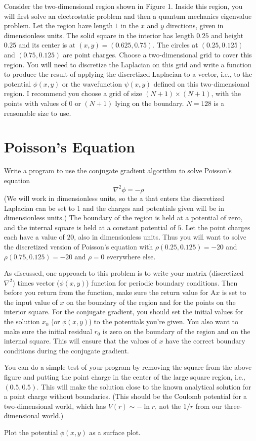 Consider the two-dimensional region shown in Figure 1. Inside this region, you will first
solve an electrostatic problem and then a quantum mechanics eigenvalue problem. Let the
region have length \(1\) in the \(x\) and \(y\) directions, given in dimensionless units.
The solid square in the interior has length \(0.25\) and height \(0.25\) and its center is
at \((x, y) = (0.625, 0.75)\). The circles at \((0.25, 0.125)\) and \((0.75, 0.125)\) are
point charges. Choose a two-dimensional grid to cover this region. You will need to
discretize the Laplacian on this grid and write a function to produce the result of applying
the discretized Laplacian to a vector, i.e., to the potential \(\phi(x, y)\) or the
wavefunction \(\psi(x, y)\) defined on this two-dimensional region. I recommend you choose a
grid of size \((N + 1) \times (N + 1)\), with the points with values of \(0\) or \((N + 1)\)
lying on the boundary. \(N = 128\) is a reasonable size to use.

\section{Poisson's Equation}

Write a program to use the conjugate gradient algorithm to solve Poisson's equation
%
\begin{equation}
    \nabla^2 \phi = -\rho
\end{equation}
%
(We will work in dimensionless units, so the a that enters the discretized Laplacian can be
set to \(1\) and the charges and potentials given will be in dimensionless units.) The
boundary of the region is held at a potential of zero, and the internal square is held at a
constant potential of \(5\). Let the point charges each have a value of \(20\), also in
dimensionless units. Thus you will want to solve the discretized version of Poisson's
equation with \(\rho(0.25, 0.125) = -20\) and \(\rho(0.75, 0.125) = -20\) and \(\rho = 0\)
everywhere else.

As discussed, one approach to this problem is to write your matrix
(discretized \(\nabla^2\)) times vector (\(\phi(x, y)\)) function for periodic boundary
conditions. Then before you return from the function, make sure the return value for
\(\mathrm{ A } x\) is set to the input value of \(x\) on the boundary of the region and for
the points on the interior square. For the conjugate gradient, you should set the initial
values for the solution \(x_0\) (or \(\phi(x, y)\)) to the potentials you're given. You also
want to make sure the initial residual \(r_0\) is zero on the boundary of the region and on
the internal square. This will ensure that the values of \(x\) have the correct boundary
conditions during the conjugate gradient.

You can do a simple test of your program by
removing the square from the above figure and putting the point charge in the center of the
large square region, i.e., \((0.5, 0.5)\). This will make the solution close to the known
analytical solution for a point charge without boundaries. (This should be the Coulomb
potential for a two-dimensional world, which has \(V(r) \sim -\ln r\), not the \(1/r\)
from our three-dimensional world.)


\Question{} Plot the potential \(\phi(x, y)\) as a surface plot.
